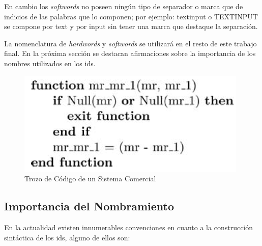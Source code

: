\documentclass[a4paper,12pt]{report}
\begin{document}
En cambio los \textit{softwords} no poseen ningún tipo de separador o marca que de indicios de las palabras que lo componen; por ejemplo: \textsf{textinput} o \textsf{TEXTINPUT} se compone por \textsf{text} y por \textsf{input} sin tener una marca que destaque la separación.

La nomenclatura de \textit{hardwords} y \textit{softwords} se utilizará en el resto de este trabajo final. En la próxima sección se destacan afirmaciones sobre la importancia de los nombres utilizados en los ids.




\begin{figure}[t] %
\centering
\includegraphics[scale= 0.70]{./idd_1.png}
\caption{Trozo de Código de un Sistema Comercial}
\label{captura2}
\end{figure} 

\subsection{Importancia del Nombramiento}
En la actualidad existen innumerables convenciones en cuanto a la construcción sintáctica de los ids, alguno de ellos son:
\end{document}

